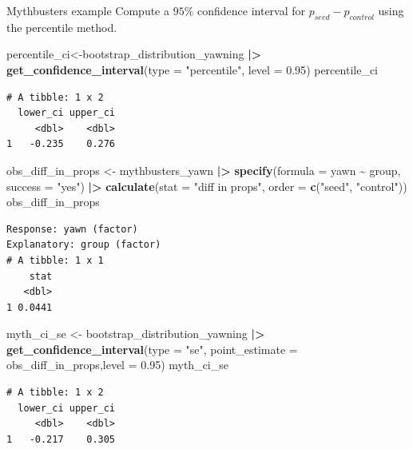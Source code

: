 \documentclass[
  ignorenonframetext,
]{beamer}
\newenvironment{Shaded}{\begin{snugshade}}{\end{snugshade}}
\newcommand{\AttributeTok}[1]{\textcolor[rgb]{0.13,0.29,0.53}{#1}}
\newcommand{\FloatTok}[1]{\textcolor[rgb]{0.00,0.00,0.81}{#1}}
\newcommand{\FunctionTok}[1]{\textcolor[rgb]{0.13,0.29,0.53}{\textbf{#1}}}
\newcommand{\NormalTok}[1]{#1}
\newcommand{\OtherTok}[1]{\textcolor[rgb]{0.56,0.35,0.01}{#1}}
\newcommand{\SpecialCharTok}[1]{\textcolor[rgb]{0.81,0.36,0.00}{\textbf{#1}}}
\newcommand{\StringTok}[1]{\textcolor[rgb]{0.31,0.60,0.02}{#1}}
\begin{document}
\begin{frame}[fragile]{Mythbusters example}
\label{mythbusters-example-3}
Compute a \(95\%\) confidence interval for \(p_{seed}-p_{control}\)
using the percentile method.

\tiny

\begin{Shaded}
\begin{Highlighting}[]
\NormalTok{percentile\_ci}\OtherTok{\textless{}{-}}\NormalTok{bootstrap\_distribution\_yawning }\SpecialCharTok{|\textgreater{}} 
  \FunctionTok{get\_confidence\_interval}\NormalTok{(}\AttributeTok{type =} \StringTok{"percentile"}\NormalTok{, }\AttributeTok{level =} \FloatTok{0.95}\NormalTok{)}
\NormalTok{percentile\_ci}
\end{Highlighting}
\end{Shaded}

\begin{verbatim}
# A tibble: 1 x 2
  lower_ci upper_ci
     <dbl>    <dbl>
1   -0.235    0.276
\end{verbatim}

\begin{Shaded}
\begin{Highlighting}[]
\NormalTok{obs\_diff\_in\_props }\OtherTok{\textless{}{-}}\NormalTok{ mythbusters\_yawn }\SpecialCharTok{|\textgreater{}} 
  \FunctionTok{specify}\NormalTok{(}\AttributeTok{formula =}\NormalTok{ yawn }\SpecialCharTok{\textasciitilde{}}\NormalTok{ group, }\AttributeTok{success =} \StringTok{"yes"}\NormalTok{) }\SpecialCharTok{|\textgreater{}} 
  \FunctionTok{calculate}\NormalTok{(}\AttributeTok{stat =} \StringTok{"diff in props"}\NormalTok{, }\AttributeTok{order =} \FunctionTok{c}\NormalTok{(}\StringTok{"seed"}\NormalTok{, }\StringTok{"control"}\NormalTok{))}
\NormalTok{obs\_diff\_in\_props}
\end{Highlighting}
\end{Shaded}

\begin{verbatim}
Response: yawn (factor)
Explanatory: group (factor)
# A tibble: 1 x 1
    stat
   <dbl>
1 0.0441
\end{verbatim}

\begin{Shaded}
\begin{Highlighting}[]
\NormalTok{myth\_ci\_se }\OtherTok{\textless{}{-}}\NormalTok{ bootstrap\_distribution\_yawning }\SpecialCharTok{|\textgreater{}} 
  \FunctionTok{get\_confidence\_interval}\NormalTok{(}\AttributeTok{type =} \StringTok{"se"}\NormalTok{, }\AttributeTok{point\_estimate =}\NormalTok{ obs\_diff\_in\_props,}\AttributeTok{level =} \FloatTok{0.95}\NormalTok{)}
\NormalTok{myth\_ci\_se}
\end{Highlighting}
\end{Shaded}

\begin{verbatim}
# A tibble: 1 x 2
  lower_ci upper_ci
     <dbl>    <dbl>
1   -0.217    0.305
\end{verbatim}

\normalsize
\end{frame}
\end{document}
